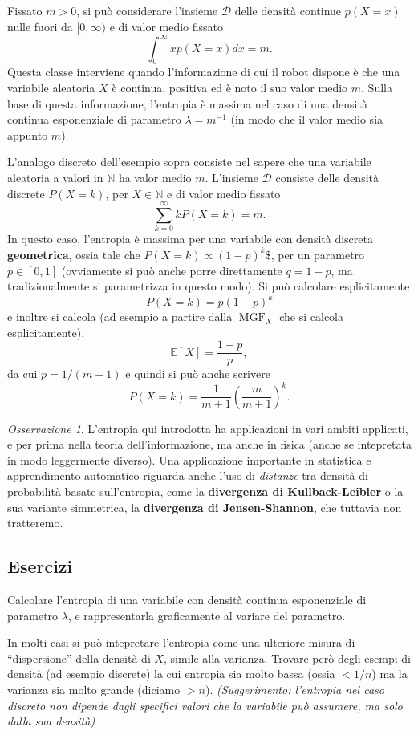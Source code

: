 \documentclass[
  italian,
  letterpaper,
]{book}
\newcommand{\bra}[1]{\left( #1 \right)}
\newcommand{\sqa}[1]{\left[ #1 \right]}
\newcommand{\N}{\mathbb{N}}
\newcommand{\E}[1]{\mathbb{E}\sqa{#1}}
\theoremstyle{definition}
\theoremstyle{remark}
\newtheorem*{remark}{Osservazione}
\begin{document}
Fissato \(m>0\), si può considerare l'insieme \(\mathcal{D}\) delle
densità continue \(p(X=x)\) nulle fuori da \([0, \infty)\) e di valor
medio fissato \[ \int _0^\infty  x p(X=x) d x = m.\] Questa classe
interviene quando l'informazione di cui il robot dispone è che una
variabile aleatoria \(X\) è continua, positiva ed è noto il suo valor
medio \(m\). Sulla base di questa informazione, l'entropia è massima nel
caso di una densità continua esponenziale di parametro
\(\lambda = m^{-1}\) (in modo che il valor medio sia appunto \(m\)).

L'analogo discreto dell'esempio sopra consiste nel sapere che una
variabile aleatoria a valori in \(\N\) ha valor medio \(m\). L'insieme
\(\mathcal{D}\) consiste delle densità discrete \(P(X=k)\), per
\(X \in \N\) e di valor medio fissato
\[ \sum_{k =0}^\infty k P(X=k)  = m.\] In questo caso, l'entropia è
massima per una variabile con densità discreta \textbf{geometrica},
ossia tale che \(P(X=k) \propto (1-p)^k\)\$, per un parametro
\(p \in [0,1]\) (ovviamente si può anche porre direttamente \(q=1-p\),
ma tradizionalmente si parametrizza in questo modo). Si può calcolare
esplicitamente \[ P(X=k) = p (1-p)^k\] e inoltre si calcola (ad esempio
a partire dalla \(\operatorname{MGF}_X\) che si calcola esplicitamente),
\[ \E{X} = \frac{1-p}{p},\] da cui \(p = 1/(m+1)\) e quindi si può anche
scrivere \[ P(X=k) = \frac{1}{m+1} \bra{ \frac m {m+1}}^k.\]

\begin{remark}
L'entropia qui introdotta ha applicazioni in vari ambiti applicati, e
per prima nella teoria dell'informazione, ma anche in fisica (anche se
intepretata in modo leggermente diverso). Una applicazione importante in
statistica e apprendimento automatico riguarda anche l'uso di
\emph{distanze} tra densità di probabilità basate sull'entropia, come la
\textbf{divergenza di Kullback-Leibler} o la sua variante simmetrica, la
\textbf{divergenza di Jensen-Shannon}, che tuttavia non tratteremo.
\end{remark}

\subsection{Esercizi}\label{esercizi-24}

Calcolare l'entropia di una variabile con densità continua esponenziale
di parametro \(\lambda\), e rappresentarla graficamente al variare del
parametro.

In molti casi si può intepretare l'entropia come una ulteriore misura di
``dispersione'' della densità di \(X\), simile alla varianza. Trovare
però degli esempi di densità (ad esempio discrete) la cui entropia sia
molto bassa (ossia \(<1/n\)) ma la varianza sia molto grande (diciamo
\(>n\)). \emph{(Suggerimento: l'entropia nel caso discreto non dipende
dagli specifici valori che la variabile può assumere, ma solo dalla sua
densità)}
\end{document}
